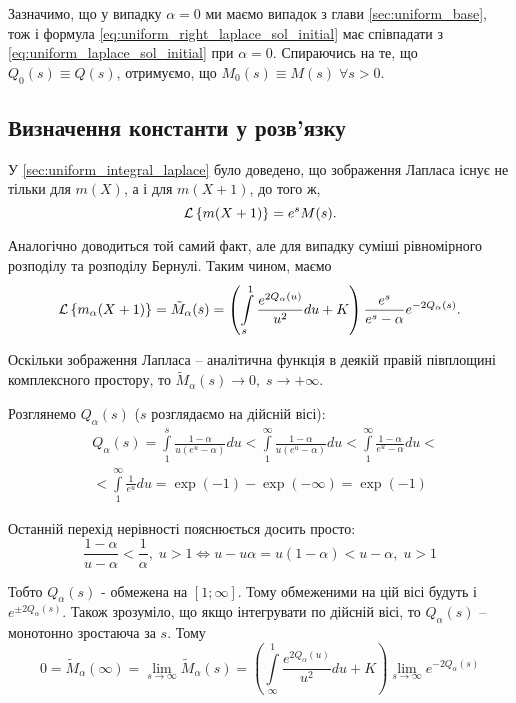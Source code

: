 Зазначимо, що у випадку $\alpha=0$ ми маємо випадок з глави \ref{sec:uniform_base}, тож і формула \eqref{eq:uniform_right_laplace_sol_initial} має співпадати з \eqref{eq:uniform_laplace_sol_initial} при $\alpha = 0$. Спираючись на те, що $Q_0(s) \equiv Q(s)$, отримуємо, що $M_0(s) \equiv M(s) \; \forall s > 0$.

\subsection{Визначення константи у розв'язку}

У \ref{sec:uniform_integral_laplace} було доведено, що зображення Лапласа існує не тільки для $m(X)$, а і для $m(X+1)$, до того ж,
\begin{equation}
	\mathcal{L}\left\{m(X+1)\right\} = e^s M(s).
\end{equation}

Аналогічно доводиться той самий факт, але для випадку суміші рівномірного розподілу та розподілу Бернулі. Таким чином, маємо
\begin{equation}
	\mathcal{L}\left\{m_\alpha(X+1)\right\} =\tilde M_\alpha(s)= \left( \int\limits_s^1 \frac{e^{2Q_\alpha(u)}}{u^2} du + K \right) \frac{e^s}{e^s - \alpha} e^{- 2Q_\alpha(s)}.
\end{equation}

Оскільки зображення Лапласа – аналітична функція в деякій правій півплощині комплексного простору, то $\tilde M_\alpha(s) \rightarrow 0,\; s \rightarrow +\infty$.

Розглянемо $Q_\alpha(s)$ ($s$ розглядаємо на дійсній вісі):
\begin{equation}
\begin{split}
	\label{eq:q_alpha_s_major}
	&Q_\alpha(s) = \int\limits_1^s \frac{1-\alpha}{u(e^u - \alpha)} du <  \int\limits_1^\infty \frac{1 - \alpha}{u(e^u - \alpha)} du < 
	\int\limits_1^\infty \frac{1- \alpha}{e^u - \alpha} du<\\
	&< \int\limits_1^\infty \frac{1}{e^u} du = \exp(-1) - \exp(-\infty) = \exp(-1)
\end{split}
\end{equation}

Останній перехід нерівності пояснюється досить просто:
$$
\frac{1-\alpha}{u - \alpha} < \frac{1}{\alpha}, \; u > 1 \Leftrightarrow u - u \alpha = u(1-\alpha) < u - \alpha, \; u > 1
$$

Тобто $Q_\alpha(s)$ - обмежена на $[1; \infty]$. Тому обмеженими на цій вісі будуть і $e^{\pm 2Q_\alpha(s)}$. Також зрозуміло, що якщо інтегрувати по дійсній вісі, то $Q_\alpha(s)$ – монотонно зростаюча за $s$. Тому
\begin{equation}
	0 = \tilde M_\alpha(\infty) = \lim_{s\rightarrow \infty} \tilde M_\alpha(s) = \left( \int\limits_\infty^1 \frac{e^{2Q_\alpha(u)}}{u^2} du + K \right) \lim_{s\rightarrow \infty} e^{- 2Q_\alpha(s)}
\end{equation}


